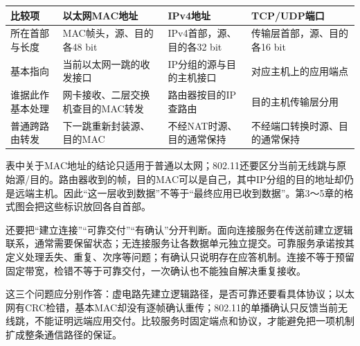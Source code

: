 \begin{wideblock}

\par\medskip\noindent\begin{minipage}{\linewidth}\fontsize{9.3}{12}\selectfont\begin{tabularx}{\linewidth}{@{}YYYY@{}}
\toprule\noalign{}
\begin{minipage}[b]{\linewidth}\raggedright
比较项
\end{minipage} & \begin{minipage}[b]{\linewidth}\raggedright
以太网MAC地址
\end{minipage} & \begin{minipage}[b]{\linewidth}\raggedright
IPv4地址
\end{minipage} & \begin{minipage}[b]{\linewidth}\raggedright
TCP/UDP端口
\end{minipage} \\
\midrule\noalign{}


所在首部与长度 & MAC帧头，源、目的各48 bit & IPv4首部，源、目的各32 bit & 传输层首部，源、目的各16 bit \\
基本指向 & 当前以太网一跳的收发接口 & IP分组的源与目的主机接口 & 对应主机上的应用端点 \\
谁据此作基本处理 & 网卡接收、二层交换机查目的MAC转发 & 路由器按目的IP查路由 & 目的主机传输层分用 \\
普通跨路由转发 & 下一跳重新封装源、目的MAC & 不经NAT时源、目的通常保持 & 不经端口转换时源、目的通常保持 \\
\bottomrule\end{tabularx}
\end{minipage}\par\medskip

\end{wideblock}

表中关于MAC地址的结论只适用于普通以太网；802.11还要区分当前无线跳与原始源/目的。路由器收到的帧，目的MAC可以是自己，其中IP分组的目的地址却仍是远端主机。因此``这一层收到数据''不等于``最终应用已收到数据''。第3～5章的格式图会把这些标识放回各自首部。

还要把``建立连接''``可靠交付''``有确认''分开判断。面向连接服务在传送前建立逻辑联系，通常需要保留状态；无连接服务让各数据单元独立提交。可靠服务承诺按其定义处理丢失、重复、次序等问题；有确认只说明存在应答机制。连接不等于预留固定带宽，检错不等于可靠交付，一次确认也不能独自解决重复接收。

这三个问题应分别作答：虚电路先建立逻辑路径，是否可靠还要看具体协议；以太网有CRC检错，基本MAC却没有逐帧确认重传；802.11的单播确认只反馈当前无线跳，不能证明远端应用交付。比较服务时固定端点和协议，才能避免把一项机制扩成整条通信路径的保证。


